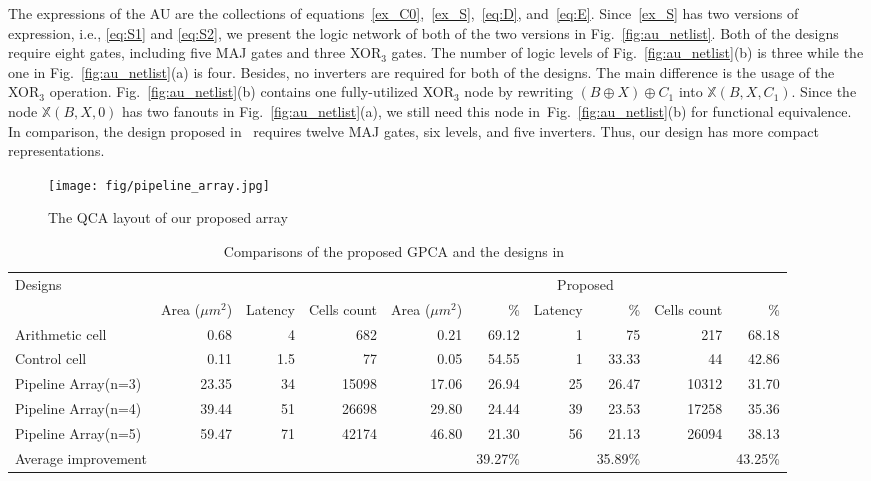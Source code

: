 \documentclass[9pt,journal,compsoc]{IEEEtran}
\begin{document}
The expressions of the AU are the collections of equations~\eqref{ex_C0},~\eqref{ex_S},~\eqref{eq:D}, and~\eqref{eq:E}.
Since~\eqref{ex_S} has two versions of expression, i.e., \eqref{eq:S1} and \eqref{eq:S2}, we present the logic network of both of the two versions in Fig.~\ref{fig:au_netlist}.
Both of the designs require eight gates, including five MAJ gates and three XOR$_3$ gates. The number of logic levels of Fig.~\ref{fig:au_netlist}(b) is three while the one in Fig.~\ref{fig:au_netlist}(a) is four.
Besides, no inverters are required for both of the designs.
The main difference is the usage of the XOR$_3$ operation. Fig.~\ref{fig:au_netlist}(b) contains one fully-utilized XOR$_3$ node by rewriting $(B \oplus X) \oplus C_1$
into $\mathbb{X}(B, X, C_1)$. Since the node $\mathbb{X}(B, X, 0)$ has two fanouts in Fig.~\ref{fig:au_netlist}(a), we still need this node in~Fig.~\ref{fig:au_netlist}(b) for functional equivalence.
In comparison, the design proposed in~\cite{2} requires twelve MAJ gates, six levels, and five inverters. Thus, our design has more compact representations.

\begin{figure}[t]
    \centering
    \texttt{[image: fig/pipeline\_array.jpg]}
    \caption{ The QCA layout of our proposed array}
\end{figure}
\begin{table}[h]
\caption{Comparisons of the proposed GPCA and the designs in~\cite{2}}
\centering
\begin{tabularx}{\textwidth}{Xrrrrrrrrr}
\toprule
            \multirow{2}{*}{Designs}& \multicolumn{3}{c}{\cite{2}}&\multicolumn{6}{c}{ Proposed }\\
            \cmidrule(lr){2-4} \cmidrule(lr){5-10}
            &Area ($\mu m^2$) & Latency & Cells count &Area ($\mu m^2$) & \% &Latency & \% & Cells count &\% \\
            \midrule
            Arithmetic cell &0.68 &4 &682 &0.21 &69.12 &1 &75 &217 &68.18 \\
            Control cell & 0.11&1.5&77&0.05&54.55&1&33.33&44&42.86\\
            Pipeline Array(n=3)&23.35&34&15098&17.06&26.94&25&26.47&10312&31.70\\
            Pipeline Array(n=4)&39.44&51&26698&29.80&24.44&39&23.53&17258&35.36\\
            Pipeline Array(n=5)&59.47&71&42174&46.80&21.30&56&21.13&26094&38.13\\
            \midrule
            Average improvement&  &  & & & 39.27\% & &35.89\% && 43.25\% \\
            \bottomrule
\end{tabularx}~\label{tab:result}
\end{table}
\end{document}
